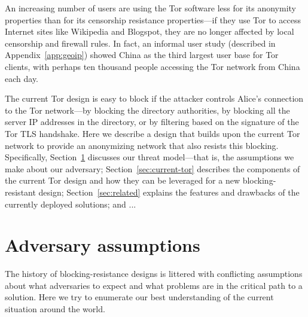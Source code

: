 \documentclass{llncs}
\begin{document}
An increasing number of users are using the Tor software
less for its anonymity properties than for its censorship
resistance properties---if they use Tor to access Internet sites like
Wikipedia
and Blogspot, they are no longer affected by local censorship
and firewall rules. In fact, an informal user study (described in
Appendix~\ref{app:geoip}) showed China as the third largest user base
for Tor clients, with perhaps ten thousand people accessing the Tor
network from China each day.

The current Tor design is easy to block if the attacker controls Alice's
connection to the Tor network---by blocking the directory authorities,
by blocking all the server IP addresses in the directory, or by filtering
based on the signature of the Tor TLS handshake. Here we describe a
design that builds upon the current Tor network to provide an anonymizing
network that also resists this blocking. Specifically,
Section~\ref{sec:adversary} discusses our threat model---that is,
the assumptions we make about our adversary; Section~\ref{sec:current-tor}
describes the components of the current Tor design and how they can be
leveraged for a new blocking-resistant design; Section~\ref{sec:related}
explains the features and drawbacks of the currently deployed solutions;
and ...




\section{Adversary assumptions}
\label{sec:adversary}

The history of blocking-resistance designs is littered with conflicting
assumptions about what adversaries to expect and what problems are
in the critical path to a solution. Here we try to enumerate our best
understanding of the current situation around the world.
\end{document}
